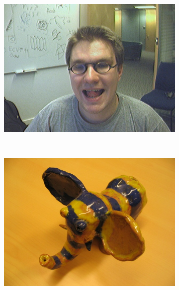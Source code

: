 \documentclass[10pt,twocolumn,letterpaper]{article}
\begin{document}
\begin{figure}[t]
        ~
        \begin{subfigure}[b]{0.15\textwidth}
                \includegraphics[width=\textwidth]{figures/input/person8.png}
        \end{subfigure}%
        ~
        \begin{subfigure}[b]{0.15\textwidth}
                \includegraphics[width=\textwidth]{figures/input/ceramic.jpg}
        \end{subfigure}%
        ~
        \begin{subfigure}[b]{0.15\textwidth}

\end{subfigure}
\end{figure}
\end{document}

